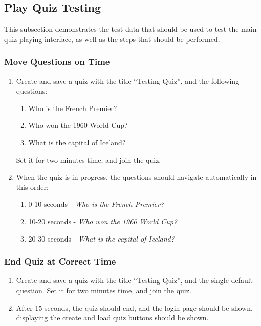 \subsection{Play Quiz Testing} %
\label{sub:play_quiz_testing}
This subsection demonstrates the test data that should be used to test the main quiz playing interface, as well as the steps that should be performed.

\subsubsection{Move Questions on Time} %
\label{ssub:move_questions_on_time}
\begin{enumerate}[leftmargin=*]
\item Create and save a quiz with the title ``Testing Quiz'', and the following questions:
\begin{enumerate}
\item Who is the French Premier?
\item Who won the 1960 World Cup?
\item What is the capital of Iceland?
\end{enumerate}
Set it for two minutes time, and join the quiz.
\item When the quiz is in progress, the questions should navigate automatically in this order:
\begin{enumerate}
\item 0-10 seconds - \textit{Who is the French Premier?}
\item 10-20 seconds - \textit{Who won the 1960 World Cup?}
\item 20-30 seconds - \textit{What is the capital of Iceland?}
\end{enumerate}
\end{enumerate}

\subsubsection{End Quiz at Correct Time} %
\label{ssub:end_quiz_at_correct_time}
\begin{enumerate}[leftmargin=*]
\item Create and save a quiz with the title ``Testing Quiz'', and the single default question. Set it for two minutes time, and join the quiz.
\item After 15 seconds, the quiz should end, and the login page should be shown, displaying the create and load quiz buttons should be shown.
\end{enumerate}
